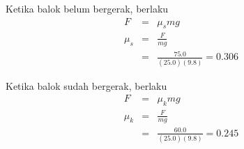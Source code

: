 \begin{solution}
Ketika balok belum bergerak, berlaku
\begin{eqnarray*}
F&=&\mu_{s}mg \\
\mu_{s}&=&\frac{F}{mg}\\
&=&\frac{75.0}{(25.0)(9.8)}=0.306
\end{eqnarray*}

Ketika balok sudah bergerak, berlaku
\begin{eqnarray*}
F&=&\mu_{k}mg \\
\mu_{k}&=&\frac{F}{mg}\\
&=&\frac{60.0}{(25.0)(9.8)}=0.245
\end{eqnarray*}
\end{solution}
